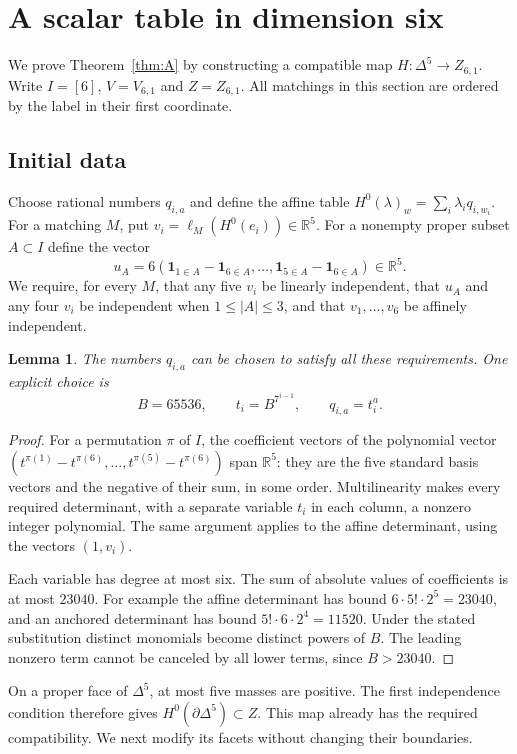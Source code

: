 \documentclass[a4paper,11pt,reqno]{amsart}
\newcommand{\R}{\mathbb R}
\newcommand{\one}{\mathbf 1}
\newtheorem{lemma}[theorem]{Lemma}
\theoremstyle{definition}
\theoremstyle{remark}
\numberwithin{equation}{section}
\begin{document}
\section{A scalar table in dimension six}\label{sec:scalar}

We prove Theorem~\ref{thm:A} by constructing a compatible map
$H:\Delta^5\to Z_{6,1}$. Write $I=[6]$, $V=V_{6,1}$ and $Z=Z_{6,1}$.
All matchings in this section are ordered by the label in their first
coordinate.

\subsection{Initial data}
Choose rational numbers $q_{i,a}$ and define the affine table
$H^0(\lambda)_w=\sum_i\lambda_iq_{i,w_i}$. For a matching $M$, put
$v_i=\ell_M(H^0(e_i))\in\R^5$. For a nonempty proper subset $A\subset I$
define the vector
\[
 u_A=6(\one_{1\in A}-\one_{6\in A},\ldots,
                   \one_{5\in A}-\one_{6\in A})\in\R^5.
\]
We require, for every $M$, that any five $v_i$ be linearly independent,
that $u_A$ and any four $v_i$ be independent when $1\le|A|\le3$, and
that $v_1,\ldots,v_6$ be affinely independent.

\begin{lemma}\label{lem:generic}
The numbers $q_{i,a}$ can be chosen to satisfy all these requirements.
One explicit choice is
\[
 B=65536,\qquad t_i=B^{7^{i-1}},\qquad q_{i,a}=t_i^a.
\]
\end{lemma}
\begin{proof}
For a permutation $\pi$ of $I$, the coefficient vectors of the
polynomial vector
$(t^{\pi(1)}-t^{\pi(6)},\ldots,t^{\pi(5)}-t^{\pi(6)})$
span $\R^5$: they are the five standard basis vectors and the negative
of their sum, in some order. Multilinearity makes every required
determinant, with a separate variable $t_i$ in each column, a nonzero
integer polynomial. The same argument applies to the affine determinant,
using the vectors $(1,v_i)$.

Each variable has degree at most six. The sum of absolute values of
coefficients is at most $23040$. For example the affine determinant
has bound $6\cdot5!\cdot2^5=23040$, and an anchored determinant has
bound $5!\cdot6\cdot2^4=11520$. Under the stated substitution distinct
monomials become distinct powers of $B$. The leading nonzero term
cannot be canceled by all lower terms, since $B>23040$.
\end{proof}

On a proper face of $\Delta^5$, at most five masses are positive.
The first independence condition therefore gives
$H^0(\partial\Delta^5)\subset Z$. This map already has the required
compatibility. We next modify its facets without changing their boundaries.
\end{document}
